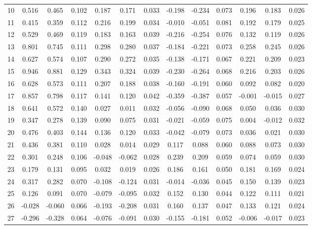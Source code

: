\begin{footnotesize}
\begin{longtable}{lcccccccccccc}
10 & 0.516 & 0.465 & 0.102 & 0.187 & 0.171 & 0.033 & -0.198 & -0.234 & 0.073 & 0.196 & 0.183 & 0.026 \\
11 & 0.415 & 0.359 & 0.112 & 0.216 & 0.199 & 0.034 & -0.010 & -0.051 & 0.081 & 0.192 & 0.179 & 0.025 \\
12 & 0.529 & 0.469 & 0.119 & 0.183 & 0.163 & 0.039 & -0.216 & -0.254 & 0.076 & 0.132 & 0.119 & 0.026 \\
13 & 0.801 & 0.745 & 0.111 & 0.298 & 0.280 & 0.037 & -0.184 & -0.221 & 0.073 & 0.258 & 0.245 & 0.026 \\
14 & 0.627 & 0.574 & 0.107 & 0.290 & 0.272 & 0.035 & -0.138 & -0.171 & 0.067 & 0.221 & 0.209 & 0.023 \\
15 & 0.946 & 0.881 & 0.129 & 0.343 & 0.324 & 0.039 & -0.230 & -0.264 & 0.068 & 0.216 & 0.203 & 0.026 \\
16 & 0.628 & 0.573 & 0.111 & 0.207 & 0.188 & 0.038 & -0.160 & -0.191 & 0.060 & 0.092 & 0.082 & 0.020 \\
17 & 0.857 & 0.798 & 0.117 & 0.141 & 0.120 & 0.042 & -0.359 & -0.387 & 0.057 & -0.001 & -0.015 & 0.027 \\
18 & 0.641 & 0.572 & 0.140 & 0.027 & 0.011 & 0.032 & -0.056 & -0.090 & 0.068 & 0.050 & 0.036 & 0.030 \\
19 & 0.347 & 0.278 & 0.139 & 0.090 & 0.075 & 0.031 & -0.021 & -0.059 & 0.075 & 0.004 & -0.012 & 0.032 \\
20 & 0.476 & 0.403 & 0.144 & 0.136 & 0.120 & 0.033 & -0.042 & -0.079 & 0.073 & 0.036 & 0.021 & 0.030 \\
21 & 0.436 & 0.381 & 0.110 & 0.028 & 0.014 & 0.029 & 0.117 & 0.088 & 0.060 & 0.088 & 0.073 & 0.030 \\
22 & 0.301 & 0.248 & 0.106 & -0.048 & -0.062 & 0.028 & 0.239 & 0.209 & 0.059 & 0.074 & 0.059 & 0.030 \\
23 & 0.179 & 0.131 & 0.095 & 0.032 & 0.019 & 0.026 & 0.186 & 0.161 & 0.050 & 0.181 & 0.169 & 0.024 \\
24 & 0.317 & 0.282 & 0.070 & -0.108 & -0.124 & 0.031 & -0.014 & -0.036 & 0.045 & 0.150 & 0.139 & 0.023 \\
25 & 0.126 & 0.091 & 0.070 & -0.079 & -0.095 & 0.032 & 0.152 & 0.130 & 0.044 & 0.122 & 0.111 & 0.021 \\
26 & -0.028 & -0.060 & 0.066 & -0.193 & -0.208 & 0.031 & 0.160 & 0.137 & 0.047 & 0.133 & 0.121 & 0.024 \\
27 & -0.296 & -0.328 & 0.064 & -0.076 & -0.091 & 0.030 & -0.155 & -0.181 & 0.052 & -0.006 & -0.017 & 0.023 \\

\end{longtable}
\end{footnotesize}
